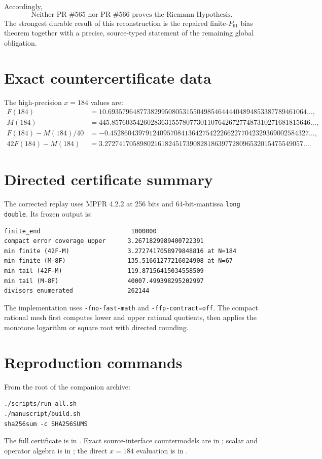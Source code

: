 \documentclass[11pt]{article}
\newcommand{\1}{\mathbf 1}
\begin{document}
Accordingly,
\[
\boxed{\text{Neither PR \#565 nor PR \#566 proves the Riemann Hypothesis.}}
\]
The strongest durable result of this reconstruction is the repaired finite-$P_{61}$ bias theorem together with a precise, source-typed statement of the remaining global obligation.

\appendix
\section{Exact countercertificate data}

The high-precision $x=184$ values are:
\begin{align*}
F(184)&=10.69357964877382995080531550498546444404894853387789461064\ldots,\\
M(184)&=445.85760354260283631557807730110764267277487310271681815646\ldots,\\
F(184)-M(184)/40&=-0.45286043979124095708413642754222662277042329369002584327\ldots,\\
42F(184)-M(184)&=3.27274170589802161824517390828186397728096532015475549057\ldots.
\end{align*}

\section{Directed certificate summary}

The corrected replay uses MPFR 4.2.2 at 256 bits and 64-bit-mantissa \texttt{long double}.  Its frozen output is:
\begin{lstlisting}
finite_end                         1000000
compact error coverage upper      3.2671829989400722391
min finite (42F-M)                3.2727417058979848816 at N=184
min finite (M-8F)                 135.51661277216024908 at N=67
min tail (42F-M)                  119.87156415034558509
min tail (M-8F)                   40007.499398295202997
divisors enumerated               262144
\end{lstlisting}
The implementation uses \texttt{-fno-fast-math} and \texttt{-ffp-contract=off}.  The compact rational mesh first computes lower and upper rational quotients, then applies the monotone logarithm or square root with directed rounding.

\section{Reproduction commands}

From the root of the companion archive:
\begin{lstlisting}
./scripts/run_all.sh
./manuscript/build.sh
sha256sum -c SHA256SUMS
\end{lstlisting}
The full certificate is in .  Exact source-interface countermodels are in ; scalar and operator algebra is in ; the direct $x=184$ evaluation is in .
\end{document}
